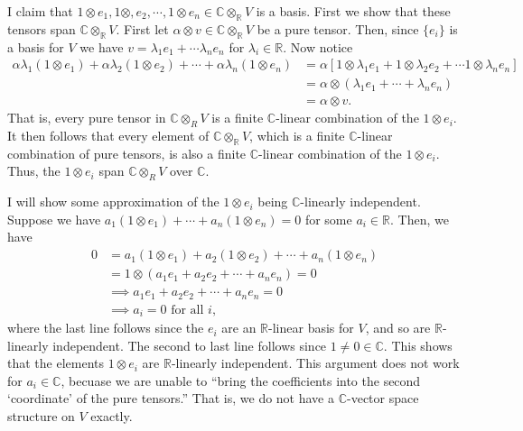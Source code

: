 \documentclass[12pt,letterpaper,boxed]{hmcpset}
\newcommand{\R}{\mathbb R}
\newcommand{\C}{\mathbb C}
\begin{document}
\begin{solution}
\item I claim that $1 \otimes e_1, 1 \otimes, e_2, \cdots, 1 \otimes
e_n \in \C \otimes_\R V$ is a basis. First we show that these tensors
span $\C \otimes_\R V$. First let $\alpha \otimes v \in \C \otimes_\R
V$ be a pure tensor. Then, since $\{e_i\}$ is a basis for $V$ we have
$v = \lambda_1 e_1 + \cdots \lambda_n e_n$ for $\lambda_i \in \R$.
Now notice 
\begin{align*}
	\alpha\lambda_1(1 \otimes e_1) + \alpha\lambda_2(1 \otimes e_2)
		+ \cdots + \alpha\lambda_n(1 \otimes e_n) 
	&= \alpha 
	\left[ 1 \otimes \lambda_1 e_1 + 1 \otimes \lambda_2 e_2 + \cdots 1 \otimes \lambda_n e_n \right] \\
	&=  \alpha \otimes (\lambda_1 e_1 + \cdots + \lambda_n e_n) \\
	&=  \alpha \otimes v.
\end{align*}
That is, every pure tensor in $\C \otimes_R V$ is a finite $\C$-linear
combination of the $1 \otimes e_i$. It then follows that every element
of $\C \otimes_\R V$, which is a finite $\C$-linear combination of
pure tensors, is also a finite $\C$-linear combination of the $1
\otimes e_i$. Thus, the $1 \otimes e_i$ span $\C \otimes_R V$ over
$\C$. 

I will show some approximation of the $1 \otimes e_i$ being
$\C$-linearly independent. Suppose we have $a_1(1 \otimes e_1) +
\cdots + a_n(1 \otimes e_n) = 0$ for some $a_i \in \R$. Then, we have
\begin{align*}
	0 &= a_1(1 \otimes e_1) + a_2(1 \otimes e_2) + \cdots + a_n(1 \otimes e_n) \\
	&= 1 \otimes (a_1 e_1 + a_2 e_2 + \cdots + a_n e_n) = 0 \\
	&\implies a_1 e_1 + a_2 e_2 + \cdots + a_n e_n = 0 \\
	&\implies a_i = 0 \text{ for all $i$,}
\end{align*}
where the last line follows since the $e_i$ are an $\R$-linear basis
for $V$, and so are $\R$-linearly independent. The second to last line
follows since $1 \neq 0 \in \C$. 
This shows that the elements $1 \otimes e_i$ are $\R$-linearly
independent. This argument does not work for $a_i \in \C$, becuase we
are unable to ``bring the coefficients into the second `coordinate'
of the pure tensors.'' That is, we do not have a $\C$-vector space
structure on $V$ exactly.


\end{solution}
\end{document}
